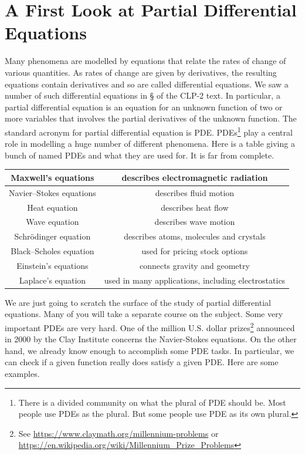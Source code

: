\section{A First Look at Partial Differential Equations}\label{sec pde}

Many phenomena are modelled by equations that relate the rates of
change of various quantities. As rates of change are given by derivatives,
the resulting equations contain derivatives and so are called
differential equations. We saw a number of such differential equations
in \S{} of the CLP-2 text. In particular, a partial differential equation is an equation for an unknown function of two or more 
variables that involves the partial derivatives of the unknown function. 
The standard acronym for partial differential equation is PDE. PDEs\footnote{There is a divided community on what the plural of PDE should be.
Most people use PDEs as the plural. But some people use PDE as its own plural.} play a central role in modelling a huge number of different phenomena. Here is a table giving a bunch of named PDEs and what they are used for. It is far from complete.

\begin{center}
\renewcommand{\arraystretch}{1.4}
     \begin{tabular}{|c|c|}
        \hline
  Maxwell's equations
      &describes electromagnetic radiation \\ \hline
  Navier--Stokes equations
      &describes fluid motion \\ \hline
  Heat equation
      &describes heat flow \\ \hline
  Wave equation
      &describes wave motion \\ \hline
  Schr\"odinger equation
      &describes atoms, molecules and crystals \\ \hline
  Black--Scholes equation
      &used for pricing stock options \\ \hline
  Einstein's equations
      &connects gravity and geometry  \\ \hline
  Laplace's equation
      &used in many applications, including electrostatics
     \\ \hline
     \end{tabular}
\renewcommand{\arraystretch}{1.0}
\end{center}


We are just going to scratch the surface of the study of partial differential equations. Many of you will take a separate course on the subject. Some very important PDEs are very hard. One of the 
million U.S. dollar prizes\footnote{See \url{https://www.claymath.org/millennium-problems} or
\url{https://en.wikipedia.org/wiki/Millennium_Prize_Problems}} announced in 2000 
by the Clay Institute concerns the Navier-Stokes equations. On the other hand, 
we already know enough to accomplish some PDE tasks. In particular, we can check if a given function really does satisfy a given PDE. Here are some examples.

